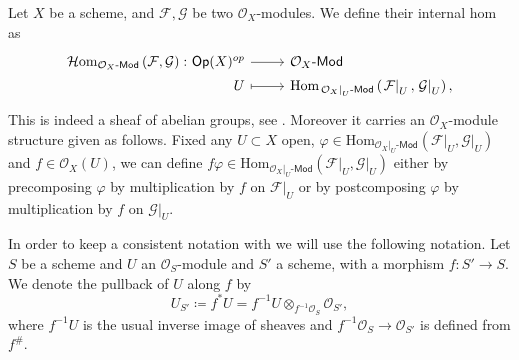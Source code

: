 \begin{defn}\label{defn:iHomOXMod}
	Let $X$ be a scheme, and $\mathcal{F}, \mathcal{G}$ be two $\mathcal{O}_{ X }$-modules.
	We define their internal hom as
	\begin{equation*}
	\begin{tikzcd}[row sep = 0ex
		,/tikz/column 1/.append style={anchor=base east}
		,/tikz/column 2/.append style={anchor=base west}]
		\mathcal{H}\mathrm{om}_{ \mathcal{O}_{ X }\text{-}\mathsf{Mod} }
		\left( \mathcal{F}, \mathcal{G} \right)\colon 
		\mathsf{Op}(X)^{op} \arrow[r, "", rightarrow] &
		\mathcal{O}_{ X }\text{-}\mathsf{Mod} \\
		U \arrow[r, "", mapsto] & 
		\mathrm{Hom}_{ \left.\mathcal{O}_{ X }\right|_{U}\text{-}\mathsf{Mod} } 
			\left( \left.\mathcal{F}\right|_{U}, \left.\mathcal{G}\right|_{U} \right)
	,\end{tikzcd}
	\end{equation*} 
	This is indeed a sheaf of abelian groups, see 
	\cite[\href{https://stacks.math.columbia.edu/tag/00AK}{Section 00AK}]{SP}.
	Moreover it carries an $\mathcal{O}_{ X }$-module structure given as follows.
	Fixed any $U \subset X$ open, 
	$\varphi \in \mathrm{Hom}_{ \left.\mathcal{O}_{ X }\right|_{U}\text{-}\mathsf{Mod}} 
	\left( \left.\mathcal{F}\right|_{U} , \left.\mathcal{G}\right|_{U} \right)$ and
	$f \in \mathcal{O}_{ X }(U)$, we can define $f \varphi \in
	\mathrm{Hom}_{ \left.\mathcal{O}_{ X }\right|_{U}\text{-}\mathsf{Mod}  } 
	\left( \left.\mathcal{F}\right|_{U} , \left.\mathcal{G}\right|_{U} \right)$
	either by precomposing $\varphi$ by multiplication
	by $f$ on $\left.\mathcal{F}\right|_{U}$ or by postcomposing $\varphi$
	by multiplication by $f$ on $\left.\mathcal{G}\right|_{U}$.
\end{defn}


\begin{ntt}[]
	In order to keep a consistent notation with
	\cite{Messing} we will use the following notation.
	Let $S$ be a scheme and $U$ an $\mathcal{O}_{ S }$-module
	and $S'$ a scheme, with a morphism
	$f\colon S' \to S$.
	We denote the pullback of $U$ along $f$ by 
	\begin{equation*}
	U_{S'} \coloneqq f^*U = 
	f^{-1}U \otimes_{f^{-1}\mathcal{O}_{ S }} \mathcal{O}_{ S' }
	,\end{equation*}
	where $f^{-1} U$ is the usual inverse image of sheaves and
	$f^{-1}\mathcal{O}_{ S } \to \mathcal{O}_{ S' }$ is defined from $f^\#$.
\end{ntt}


